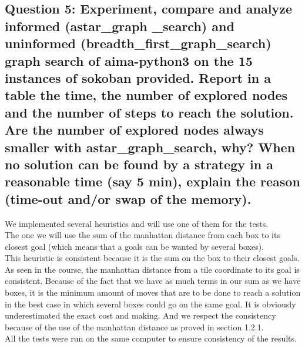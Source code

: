 \documentclass[a4paper,10pt]{article}
\begin{document}
		\subsection{Question 5: Experiment, compare and analyze informed (astar\_graph \_search) and uninformed (breadth\_first\_graph\_search) graph search of aima-python3 on the 15 instances of sokoban provided. Report in a table the time, the number of explored nodes and the number of steps to reach the solution. Are the number of explored nodes always smaller with astar\_graph\_search, why? When no solution can be found by a strategy in a reasonable time (say 5 min), explain the reason (time-out and/or swap of the memory).}
			We implemented several heuristics and will use one of them for the tests. \\
			The one we will use the sum of the manhattan distance from each box to its closest goal (which means that a goals can be wanted by several boxes). \\
			This heuristic is consistent because it is the sum on the box to their closest goals. As seen in the course, the manhattan distance from a tile coordinate to its goal is consistent. Because of the fact that we have as much terms in our sum as we have boxes, it is the minimum amount of moves that are to be done to reach a solution in the best case in which several boxes could go on the same goal. It is obviously underestimated the exact cost and making. And we respect the consistency because of the use of the manhattan distance as proved in section 1.2.1.\\
			All the tests were run on the same computer to ensure consistency of the results.\\
			
\end{document}
